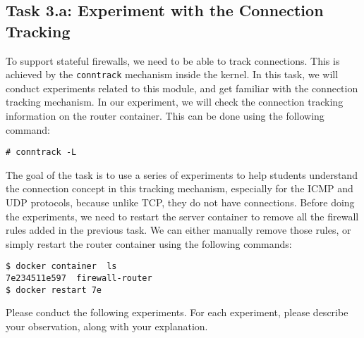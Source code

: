 \subsection{Task 3.a: Experiment with the Connection Tracking} 


To support stateful firewalls, we need to be able to track connections. 
This is achieved by the \texttt{conntrack} mechanism inside the kernel. 
In this task, we will conduct experiments related to this module, and 
get familiar with the connection tracking mechanism. 
In our experiment, we will check the connection tracking information
on the router container. This can be done using the following command: 

\begin{lstlisting}
# conntrack -L
\end{lstlisting}

The goal of the task is to use a series of experiments to 
help students understand the 
connection concept in this tracking mechanism, especially
for the ICMP and UDP protocols, because unlike TCP,  they 
do not have connections. 
Before doing the experiments, we need to restart the server container to
remove all the firewall rules added in the previous task. We can either 
manually remove those rules, or simply restart the router container 
using the following commands:

\begin{lstlisting}
$ docker container  ls
7e234511e597  firewall-router
$ docker restart 7e
\end{lstlisting}

Please conduct the following experiments. For each experiment, please 
describe your observation, along with your explanation. 

